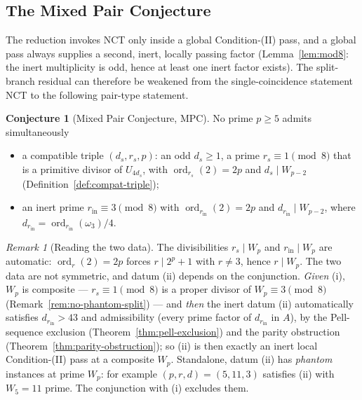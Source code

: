 \documentclass[11pt]{amsart}
\theoremstyle{plain}
\theoremstyle{definition}
\newtheorem{conjecture}[theorem]{Conjecture}
\theoremstyle{remark}
\newtheorem{remark}[theorem]{Remark}
\numberwithin{equation}{section}
\newcommand{\ord}{\operatorname{ord}}
\begin{document}
\subsection{The Mixed Pair Conjecture}\label{sec:mpc}

The reduction invokes NCT only inside a global Condition-(II) pass, and a global pass always supplies a second, inert, locally passing factor (Lemma~\ref{lem:mod8}: the inert multiplicity is odd, hence at least one inert factor exists). The split-branch residual can therefore be weakened from the single-coincidence statement NCT to the following pair-type statement.

\begin{conjecture}[Mixed Pair Conjecture, MPC]\label{conj:mpc}
No prime $p \geq 5$ admits simultaneously
\begin{itemize}
\item[(i)] a compatible triple $(d_s, r_s, p)$: an odd $d_s \geq 1$, a prime $r_s \equiv 1 \pmod 8$ that is a primitive divisor of $U_{4 d_s}$, with $\ord_{r_s}(2) = 2p$ and $d_s \mid W_{p-2}$ (Definition~\ref{def:compat-triple});
\item[(ii)] an inert prime $r_{\mathrm{in}} \equiv 3 \pmod 8$ with $\ord_{r_{\mathrm{in}}}(2) = 2p$ and $d_{r_{\mathrm{in}}} \mid W_{p-2}$, where $d_{r_{\mathrm{in}}} = \ord_{r_{\mathrm{in}}}(\omega_3)/4$.
\end{itemize}
\end{conjecture}

\begin{remark}[Reading the two data]\label{rem:mpc-data}
The divisibilities $r_s \mid W_p$ and $r_{\mathrm{in}} \mid W_p$ are automatic: $\ord_r(2) = 2p$ forces $r \mid 2^p + 1$ with $r \neq 3$, hence $r \mid W_p$. The two data are not symmetric, and datum (ii) depends on the conjunction. \emph{Given} (i), $W_p$ is composite --- $r_s \equiv 1 \pmod 8$ is a proper divisor of $W_p \equiv 3 \pmod 8$ (Remark~\ref{rem:no-phantom-split}) --- and \emph{then} the inert datum (ii) automatically satisfies $d_{r_{\mathrm{in}}} > 43$ and admissibility (every prime factor of $d_{r_{\mathrm{in}}}$ in $A$), by the Pell-sequence exclusion (Theorem~\ref{thm:pell-exclusion}) and the parity obstruction (Theorem~\ref{thm:parity-obstruction}); so (ii) is then exactly an inert local Condition-(II) pass at a composite $W_p$. Standalone, datum (ii) has \emph{phantom} instances at prime $W_p$: for example $(p, r, d) = (5, 11, 3)$ satisfies (ii) with $W_5 = 11$ prime. The conjunction with (i) excludes them.
\end{remark}
\end{document}
